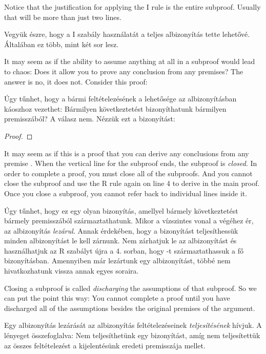 Notice that the justification for applying the {\eif}I rule is the entire subproof. Usually that will be more than just two lines.

Vegyük észre, hogy a {\eif}I szabály használatát a teljes albizonyítás tette lehetővé. Általában ez több, mint két sor lesz.

It may seem as if the ability to assume anything at all in a subproof would lead to chaos: Does it allow you to prove any conclusion from any premises? The answer is no, it does not. Consider this proof:

Úgy tűnhet, hogy a bármi feltételezésének a lehetősége az albizonyításban káoszhoz vezethet: Bármilyen következtetést bizonyíthatunk bármilyen premisszából? A válasz nem. Nézzük ezt a bizonyítást:



\begin{proof}
	\open
		 
	\close
\end{proof}

It may seem as if this is a proof that you can derive any conclusions  from any premise . When the vertical line for the subproof ends, the subproof is \emph{closed}. In order to complete a proof, you must close all of the subproofs. And you cannot close the subproof and use the R rule again on line 4 to derive  in the main proof. Once you close a subproof, you cannot refer back to individual lines inside it.

Úgy tűnhet, hogy ez egy olyan bizonyítás, amellyel bármely  következtetést bármely  premisszából származtathatunk. Mikor a vízszintes vonal a végéhez ér, az albizonyítás \emph{lezárul}. Annak érdekében, hogy a bizonyítást teljesíthessük minden albizonyítást le kell zárnunk. Nem zárhatjuk le az albizonyítást és használhatjuk az R szabályt újra a 4. sorban, hogy -t származtathassuk a fő bizonyításban. Amennyiben már lezártunk egy albizonyítást, többé nem hivatkozhatunk vissza annak egyes soraira.

Closing a subproof is called \emph{discharging} the assumptions of that subproof. So we can put the point this way: You cannot complete a proof until you have discharged all of the assumptions besides the original premises of the argument.

Egy albizonyítás lezárását az albizonyítás feltételezéseinek \emph{teljesítésének} hívjuk. A lényeget összefoglalva: Nem teljesíthetünk egy bizonyítást, amíg nem teljesítettük az összes feltételezést a kijelentésünk eredeti premisszája mellet.


